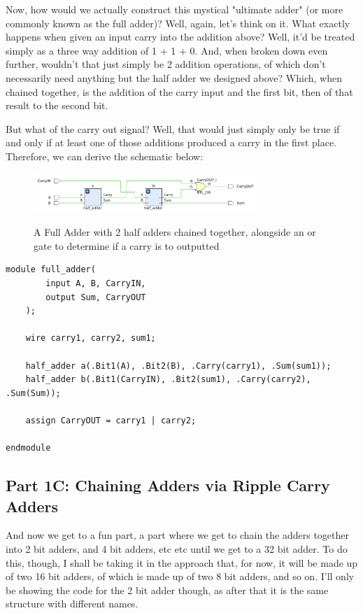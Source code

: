 \documentclass{article}
\begin{document}
Now, how would we actually construct this mystical "ultimate adder" (or more commonly known as the full adder)? Well, again, let's think on it. What exactly happens when given an input carry into the addition above? Well, it'd be treated simply as a three way addition of 1 + 1 + 0. And, when broken down even further, wouldn't that just simply be 2 addition operations, of which don't necessarily need anything but the half adder we designed above? Which, when chained together, is the addition of the carry input and the first bit, then of that result to the second bit.

But what of the carry out signal? Well, that would just simply only be true if and only if at least one of those additions produced a carry in the first place. Therefore, we can derive the schematic below:
\begin{figure}[!htbp]
    \centering
    \caption{A Full Adder with 2 half adders chained together, alongside an or gate to determine if a carry is to outputted}
    \includegraphics[width=0.75\textwidth]{pictures/part1/full_adder.png}
    \label{Full Adder}
\end{figure}\newline
\begin{lstlisting}[caption={Verilog code of the Full Adder schematic above}, label={Full Adder Verilog}, style=Verilog]
module full_adder(
        input A, B, CarryIN,
        output Sum, CarryOUT
    );
    
    wire carry1, carry2, sum1;
    
    half_adder a(.Bit1(A), .Bit2(B), .Carry(carry1), .Sum(sum1));
    half_adder b(.Bit1(CarryIN), .Bit2(sum1), .Carry(carry2), .Sum(Sum));
    
    assign CarryOUT = carry1 | carry2; 
    
endmodule
\end{lstlisting}


\subsection{Part 1C: Chaining Adders via Ripple Carry Adders}
\qquad And now we get to a fun part, a part where we get to chain the adders together into 2 bit adders, and 4 bit adders, etc etc until we get to a 32 bit adder. To do this, though, I shall be taking it in the approach that, for now, it will be made up of two 16 bit adders, of which is made up of two 8 bit adders, and so on. I'll only be showing the code for the 2 bit adder though, as after that it is the same structure with different names.\\
\end{document}

